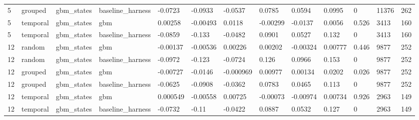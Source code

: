 \begin{tabular}{lllllllllllll}
5 & grouped & gbm\_states & baseline\_harness & -0.0723 & -0.0933 & -0.0537 & 0.0785 & 0.0594 & 0.0995 & 0 & 11376 & 262 \\
5 & temporal & gbm\_states & gbm & 0.00258 & -0.00493 & 0.0118 & -0.00299 & -0.0137 & 0.0056 & 0.526 & 3413 & 160 \\
5 & temporal & gbm\_states & baseline\_harness & -0.0859 & -0.133 & -0.0482 & 0.0901 & 0.0527 & 0.132 & 0 & 3413 & 160 \\
12 & random & gbm\_states & gbm & -0.00137 & -0.00536 & 0.00226 & 0.00202 & -0.00324 & 0.00777 & 0.446 & 9877 & 252 \\
12 & random & gbm\_states & baseline\_harness & -0.0972 & -0.123 & -0.0724 & 0.126 & 0.0966 & 0.153 & 0 & 9877 & 252 \\
12 & grouped & gbm\_states & gbm & -0.00727 & -0.0146 & -0.000969 & 0.00977 & 0.00134 & 0.0202 & 0.026 & 9877 & 252 \\
12 & grouped & gbm\_states & baseline\_harness & -0.0625 & -0.0908 & -0.0362 & 0.0783 & 0.0465 & 0.113 & 0 & 9877 & 252 \\
12 & temporal & gbm\_states & gbm & 0.000549 & -0.00558 & 0.00725 & -0.00073 & -0.00974 & 0.00734 & 0.926 & 2963 & 149 \\
12 & temporal & gbm\_states & baseline\_harness & -0.0732 & -0.11 & -0.0422 & 0.0887 & 0.0532 & 0.127 & 0 & 2963 & 149 \\
\bottomrule
\end{tabular}